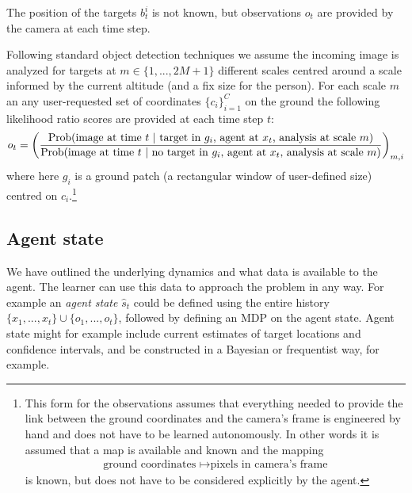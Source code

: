 \documentclass{article}
\newcommand{\nn}{\nonumber}
\newcommand{\Prob}{{\rm Prob}}
\begin{document}
The position of the targets $b^i_t$ is not known, but observations $o_t$ are provided by the camera at each time step.

Following standard object detection techniques we assume the incoming image is analyzed for targets at $m\in \{1,...,2M + 1\}$ different scales centred around a scale informed by the current altitude (and a fix size for the person). For each scale $m$ an any user-requested set of coordinates $\{c_i\}_{i=1}^C$ on the ground the following likelihood ratio scores are provided at each time step $t$:
\begin{align}
o_{t} = \left(\frac{\Prob(\mbox{image at time } t~|~\mbox{target in $g_{i}$, agent at $x_t$, analysis at scale $m$})}{\Prob(\mbox{image at time }
t~|~\mbox{no target in $g_{i}$, agent at $x_t$, analysis at scale $m$})}\right)_{m,i} \nn
\end{align}
where here $g_{i}$ is a ground patch (a rectangular window of user-defined size) centred on $c_i$.\footnote{This form for the observations assumes that everything needed to provide the link between the ground coordinates and the camera's frame is engineered by hand and does not have to be learned autonomously. In other words it is assumed that a map is available and known and the mapping
\begin{align}
\mbox{ground coordinates } \mapsto \mbox{pixels in camera's frame}\nn
\end{align}
is known, but does not have to be considered explicitly by the agent.}


\subsection{Agent state}

We have outlined the underlying dynamics and what data is available to the agent. The learner can use this data to approach the problem in any way. For example an \emph{agent state} $\hat s_t$ could be defined using the entire history $\{x_1,...,x_t\}\cup\{o_1,...,o_t\}$, followed by defining an MDP on the agent state. Agent state might for example include current estimates of target locations and confidence intervals, and be constructed in a Bayesian or frequentist way, for example.
\end{document}

